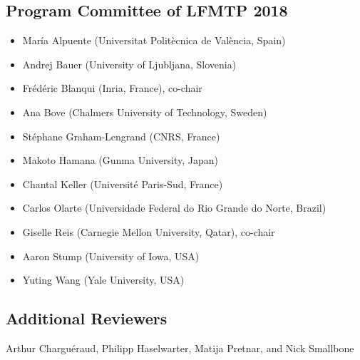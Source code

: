 \documentclass[submission,copyright,creativecommons]{eptcs}
\begin{document}
\subsection*{Program Committee of LFMTP 2018}

\begin{itemize}\setlength\itemsep{0em}
  \item Mar\'{i}a Alpuente (Universitat Polit\`{e}cnica de Val\`{e}ncia, Spain)
  \item Andrej Bauer (University of Ljubljana, Slovenia)
  \item Fr\'{e}d\'{e}ric Blanqui (Inria, France), co-chair
  \item Ana Bove (Chalmers University of Technology, Sweden)
  \item St\'{e}phane Graham-Lengrand (CNRS, France)
  \item Makoto Hamana (Gunma University, Japan)
  \item Chantal Keller (Universit\'{e} Paris-Sud, France)
  \item Carlos Olarte (Universidade Federal do Rio Grande do Norte, Brazil)
  \item Giselle Reis (Carnegie Mellon University, Qatar), co-chair
  \item Aaron Stump (University of Iowa, USA)
  \item Yuting Wang (Yale University, USA)
\end{itemize}

\subsection*{Additional Reviewers}

  Arthur Charguéraud, Philipp Haselwarter, Matija Pretnar, and Nick Smallbone
\end{document}

